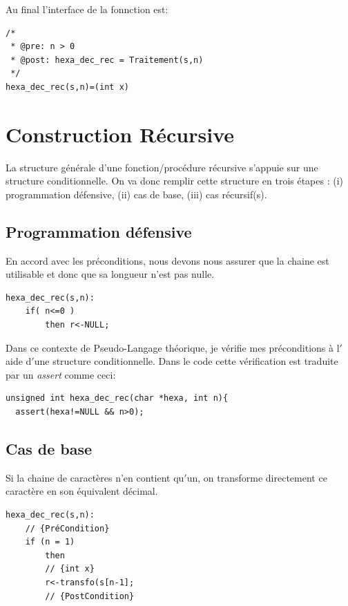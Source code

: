 \documentclass[a4paper, 11pt, oneside]{article}
\begin{document}
Au final l'interface de la fonnction est:

\begin{lstlisting}
/* 
 * @pre: n > 0
 * @post: hexa_dec_rec = Traitement(s,n)
 */
hexa_dec_rec(s,n)=(int x)
\end{lstlisting}


\section{Construction Récursive}\label{recur}

La structure générale d’une fonction/procédure récursive s’appuie sur une 
structure conditionnelle. On va donc remplir cette structure en trois étapes : 
(i) programmation défensive, (ii) cas de base, (iii) cas récursif(s).

\subsection{Programmation défensive}


En accord avec les préconditions, nous devons nous assurer que la chaine est
utilisable et donc que sa longueur n'est pas nulle. 

\begin{lstlisting}
hexa_dec_rec(s,n):
    if( n<=0 )
        then r<-NULL;
\end{lstlisting}

Dans ce contexte de Pseudo-Langage théorique, je vérifie mes préconditions à 
l$'$aide d$'$une structure conditionnelle. Dans le code cette vérification est traduite par un \textit{assert} comme ceci:

\begin{lstlisting}
unsigned int hexa_dec_rec(char *hexa, int n){
  assert(hexa!=NULL && n>0);
\end{lstlisting}


\subsection{Cas de base}


Si la chaine de caractères n'en contient qu$'$un, on transforme directement ce 
caractère en son équivalent décimal.

\begin{lstlisting}
hexa_dec_rec(s,n):
    // {PréCondition}
    if (n = 1)
        then
        // {int x}
        r<-transfo(s[n-1];
        // {PostCondition}
\end{lstlisting}
\end{document}
